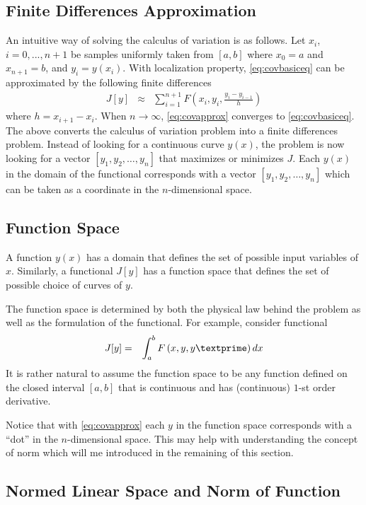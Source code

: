 \subsection{Finite Differences Approximation}

An intuitive way of solving the calculus of variation is as follows. Let $x_i$, $i=0,...,n+1$ be samples uniformly taken from $[a,b]$ where $x_0 = a$ and $x_{n+1}=b$, and $y_i = y(x_i)$. With localization property, \eqref{eq:covbasiceq} can be approximated by the following finite differences
\begin{eqnarray}
	J[y] &\approx&  \sum_{i=1}^{n+1} F\left(x_i, y_i, \frac{y_i-y_{i-1}}{h}\right) \label{eq:covapprox}
\end{eqnarray}
where $h=x_{i+1}-x_i$. When $n\rightarrow\infty$, \eqref{eq:covapprox} converges to \eqref{eq:covbasiceq}. The above converts the calculus of variation problem into a finite differences problem. Instead of looking for a continuous curve $y(x)$, the problem is now looking for a vector $[y_1, y_2, \ldots, y_n]$ that maximizes or minimizes $J$. Each $y(x)$ in the domain of the functional corresponds with a vector $[y_1, y_2, \ldots, y_n]$ which can be taken as a coordinate in the $n$-dimensional space.


\subsection{Function Space}

A function $y(x)$ has a domain that defines the set of possible input variables of $x$. Similarly, a functional $J[y]$ has a function space that defines the set of possible choice of curves of $y$. 

The function space is determined by both the physical law behind the problem as well as the formulation of the functional. For example, consider functional
\begin{eqnarray}
	J[y] &=& \int_{a}^{b} F\left(x, y, y\textprime\right)dx \nonumber
\end{eqnarray}
It is rather natural to assume the function space to be any function defined on the closed interval $[a,b]$ that is continuous and has (continuous) $1$-st order derivative.

Notice that with \eqref{eq:covapprox} each $y$ in the function space corresponds with a ``dot'' in the $n$-dimensional space. This may help with understanding the concept of norm which will me introduced in the remaining of this section. 

\subsection{Normed Linear Space and Norm of Function}

